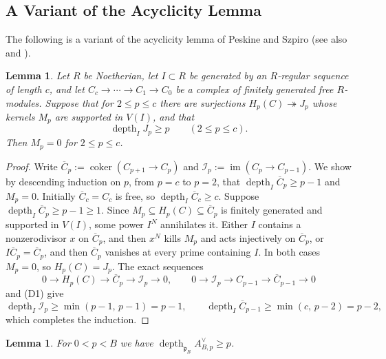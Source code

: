 \documentclass[11pt]{amsart}
\numberwithin{equation}{section}
\newtheorem{lemma}[theorem]{Lemma}
\theoremstyle{definition}
\theoremstyle{remark}
\newcommand{\pp}{\mathfrak{p}}
\newcommand{\depth}{\operatorname{depth}}
\newcommand{\im}{\operatorname{im}}
\begin{document}
\subsection{A Variant of the Acyclicity Lemma}
The following is a variant of the acyclicity lemma of Peskine and Szpiro \cite[Lemme~1.8]{PS73} (see also \cite[Tag~00N0]{Stacks} and \cite{BE73}).

\begin{lemma}\label{lem:acyclic}
Let $R$ be Noetherian, let $I\subset R$ be generated by an $R$-regular sequence of length $c$, and let $C_c\to\cdots\to C_1\to C_0$ be a complex of finitely generated free $R$-modules. Suppose that for $2\le p\le c$ there are surjections $H_p(C)\twoheadrightarrow J_p$ whose kernels $M_p$ are supported in $V(I)$, and that
\begin{equation}\label{eq:depth-hyp}
\depth_IJ_p\ge p\qquad(2\le p\le c).
\end{equation}
Then $M_p=0$ for $2\le p\le c$.
\end{lemma}

\begin{proof}
Write $\overline C_p:=\operatorname{coker}(C_{p+1}\to C_p)$ and $\mathcal I_p:=\im(C_p\to C_{p-1})$. We show by descending induction on $p$, from $p=c$ to $p=2$, that $\depth_I\overline C_p\ge p-1$ and $M_p=0$. Initially $\overline C_c=C_c$ is free, so $\depth_I\overline C_c\ge c$. Suppose $\depth_I\overline C_p\ge p-1\ge1$. Since $M_p\subseteq H_p(C)\subseteq\overline C_p$ is finitely generated and supported in $V(I)$, some power $I^N$ annihilates it. Either $I$ contains a nonzerodivisor $x$ on $\overline C_p$, and then $x^N$ kills $M_p$ and acts injectively on $\overline C_p$, or $I\overline C_p=\overline C_p$, and then $\overline C_p$ vanishes at every prime containing $I$. In both cases $M_p=0$, so $H_p(C)=J_p$. The exact sequences
\begin{equation}\label{eq:acyclic-ses}
0\to H_p(C)\to\overline C_p\to\mathcal I_p\to0,\qquad 0\to\mathcal I_p\to C_{p-1}\to\overline C_{p-1}\to0
\end{equation}
and (D1) give
\begin{equation}\label{eq:depth-ineq}
\depth_I\mathcal I_p\ge\min(p-1,\,p-1)=p-1,\qquad \depth_I\overline C_{p-1}\ge\min(c,\,p-2)=p-2,
\end{equation}
which completes the induction.
\end{proof}

\begin{lemma}\label{lem:sourcedepth}
For $0<p<B$ we have $\depth_{\pp_B}A^\vee_{B,p}\ge p$.
\end{lemma}
\end{document}

